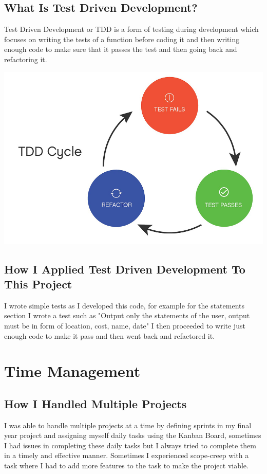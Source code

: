 \subsection{What Is Test Driven Development?}
Test Driven Development or TDD is a form of testing during development which focuses on writing the tests of a function before coding it and then writing enough code to make sure that it passes the test and then going back and refactoring it\cite{TDD}.
\begin{center}
\includegraphics[width=\linewidth]{img/tdd.jpg}\cite{TDDImage}
\end{center}
\subsection{How I Applied Test Driven Development To This Project}
I wrote simple tests as I developed this code, for example for the statements section I wrote a test such as "Output only the statements of the user, output must be in form of location, cost, name, date" I then proceeded to write just enough code to make it pass and then went back and refactored it.
\section{Time Management}
\subsection{How I Handled Multiple Projects}
I was able to handle multiple projects at a time by defining sprints in my final year project and assigning myself daily tasks using the Kanban Board, sometimes I had issues in completing these daily tasks but I always tried to complete them in a timely and effective manner.  Sometimes I experienced scope-creep with a task where I had to add more features to the task to make the project viable.
